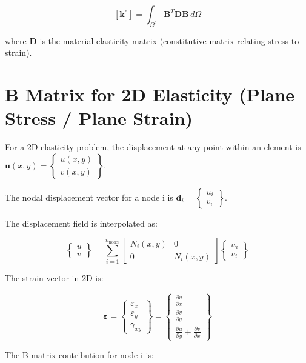 \documentclass[
  11pt,
  a4paper,
]{scrbook}
\begin{document}
\[[\mathbf{k}^e] = \int_{\Omega^e} \mathbf{B}^T \mathbf{D} \mathbf{B} \, d\Omega\]

where \(\mathbf{D}\) is the material elasticity matrix (constitutive
matrix relating stress to strain).

\section{B Matrix for 2D Elasticity (Plane Stress / Plane
Strain)}\label{b-matrix-for-2d-elasticity-plane-stress-plane-strain}

For a 2D elasticity problem, the displacement at any point within an
element is
\(\mathbf{u}(x,y) = \begin{Bmatrix} u(x,y) \\ v(x,y) \end{Bmatrix}\).

The nodal displacement vector for a node i is
\(\mathbf{d}_i = \begin{Bmatrix} u_i \\ v_i \end{Bmatrix}\).

The displacement field is interpolated as:

\[\begin{Bmatrix} u \\ v \end{Bmatrix} = \sum_{i=1}^{n_{\text{nodes}}} \begin{bmatrix} N_i(x,y) & 0 \\ 0 & N_i(x,y) \end{bmatrix} \begin{Bmatrix} u_i \\ v_i \end{Bmatrix}\]

The strain vector in 2D is:

\[\boldsymbol{\varepsilon} = \begin{Bmatrix} \varepsilon_x \\ \varepsilon_y \\ \gamma_{xy} \end{Bmatrix} = \begin{Bmatrix} \frac{\partial u}{\partial x} \\ \frac{\partial v}{\partial y} \\ \frac{\partial u}{\partial y} + \frac{\partial v}{\partial x} \end{Bmatrix}\]

The B matrix contribution for node i is:
\end{document}
